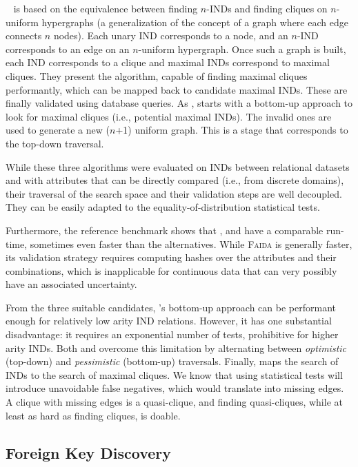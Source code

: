 \Find~\cite{koeller2003discovery} is based on the equivalence
between finding $n$-INDs and finding cliques on $n$-uniform hypergraphs (a generalization
of the concept of a graph where each edge connects $n$ nodes). Each unary \gls{IND} corresponds
to a node, and an $n$-IND corresponds to an edge on an $n$-uniform hypergraph.
Once such a graph is built, each \gls{IND} corresponds to a clique and maximal \glspl{IND}
correspond to maximal cliques. They present the \Hyperclique algorithm,
capable of finding maximal cliques performantly, which can be mapped back to candidate
maximal \glspl{IND}. These are finally validated using database queries.
As \Zigzag, \Find starts with a bottom-up
approach to look for maximal cliques (i.e., potential maximal \glspl{IND}). The invalid ones
are used to generate a new ($n$+1) uniform graph. This is a stage that corresponds to the top-down
traversal.

While these three algorithms were evaluated on \glspl{IND} between relational datasets
and with attributes that can be directly compared (i.e., from discrete domains), their
traversal of the search space and their validation steps are well decoupled. They
can be easily adapted to the equality-of-distribution statistical tests.

Furthermore, the reference benchmark shows that \Mind, \Find
and \Zigzag have a comparable run-time, sometimes even
faster than the alternatives.
While \textsc{Faida} is generally faster, its
validation strategy requires computing hashes over the
attributes and their combinations, which is inapplicable
for continuous data that can very possibly have an associated uncertainty.

From the three suitable candidates, \Mind's bottom-up approach can be performant enough for
relatively low arity \gls{IND} relations. However, it has one substantial disadvantage:
it requires an exponential number of tests, prohibitive for higher arity \glspl{IND}.
Both \Zigzag and \Find overcome this limitation by alternating between \emph{optimistic}
(top-down) and \emph{pessimistic} (bottom-up) traversals.
Finally, \Find maps the search of \glspl{IND} to the search of maximal cliques. We know that
using statistical tests will introduce unavoidable false negatives, which would
translate into missing edges.
A clique with missing edges is a quasi-clique, and finding quasi-cliques, while at least
as hard as finding cliques, is doable.

\subsection{Foreign Key Discovery}

